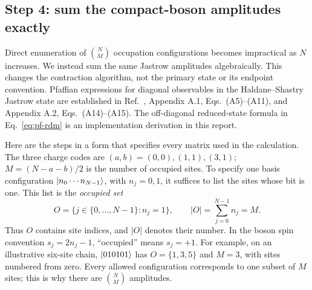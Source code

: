 \subsection{Step 4: sum the compact-boson amplitudes exactly}
\label{sec:boson-contraction}
Direct enumeration of $\binom NM$ occupation configurations becomes
impractical as $N$ increases. We instead sum the same Jastrow amplitudes
algebraically. This changes the contraction algorithm, not the primary
state or its endpoint convention. Pfaffian expressions for diagonal
observables in the Haldane--Shastry Jastrow state are established in
Ref.~\cite{Stephan}, Appendix A.1, Eqs.~(A5)--(A11), and Appendix A.2,
Eqs.~(A14)--(A15). The off-diagonal reduced-state formula in
Eq.~\eqref{eq:pf-rdm} is an
implementation derivation in this report. 

Here are the steps in a form that specifies every matrix used in the calculation.
The three charge codes are $(a,b)=(0,0),(1,1),(3,1)$; $M=(N-a-b)/2$ is
the number of occupied sites. To specify one basis configuration
$\lvert n_0\cdots n_{N-1}\rangle$, with $n_j=0,1$, it suffices to list the sites
whose bit is one. This list is the \emph{occupied set}
\begin{equation}
 O=\{j\in\{0,\ldots,N-1\}:n_j=1\},\qquad
 |O|=\sum_{j=0}^{N-1}n_j=M.
 \label{eq:occupied-set}
\end{equation}
Thus $O$ contains site indices, and $|O|$ denotes their number. In the
boson spin convention $s_j=2n_j-1$, ``occupied'' means $s_j=+1$. For
example, on an illustrative six-site chain, $\lvert 010101\rangle$ has
$O=\{1,3,5\}$ and $M=3$, with sites numbered from zero.
Every allowed configuration corresponds to one subset of $M$ sites;
this is why there are $\binom NM$ amplitudes.

